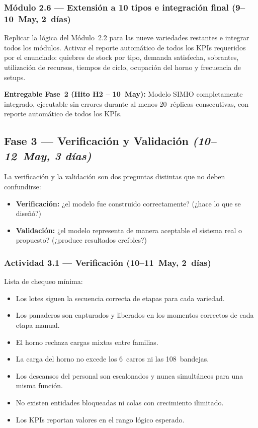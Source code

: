 \documentclass[12pt]{article}
\begin{document}
\subsubsection{Módulo 2.6 --- Extensión a 10 tipos e integración final \quad(9--10~May, 2~días)}

Replicar la lógica del Módulo~2.2 para las nueve variedades restantes e integrar todos los módulos. Activar el reporte automático de todos los KPIs requeridos por el enunciado: quiebres de stock por tipo, demanda satisfecha, sobrantes, utilización de recursos, tiempos de ciclo, ocupación del horno y frecuencia de setups.

\medskip
\noindent\colorbox{grisclaro}{\parbox{\dimexpr\linewidth-2\fboxsep\relax}{\vspace{2pt}\textbf{Entregable Fase~2 (Hito H2 -- 10~May):} Modelo SIMIO completamente integrado, ejecutable sin errores durante al menos 20~réplicas consecutivas, con reporte automático de todos los KPIs.\vspace{2pt}}}

\subsection{Fase 3 --- Verificación y Validación \quad\textit{(10--12~May, 3 días)}}

La verificación y la validación son dos preguntas distintas que no deben confundirse:
\begin{itemize}
  \item \textbf{Verificación:} ¿el modelo fue construido correctamente? (¿hace lo que se diseñó?)
  \item \textbf{Validación:} ¿el modelo representa de manera aceptable el sistema real o propuesto? (¿produce resultados creíbles?)
\end{itemize}

\subsubsection{Actividad 3.1 --- Verificación \quad(10--11~May, 2~días)}

Lista de chequeo mínima:
\begin{itemize}
  \item Los lotes siguen la secuencia correcta de etapas para cada variedad.
  \item Los panaderos son capturados y liberados en los momentos correctos de cada etapa manual.
  \item El horno rechaza cargas mixtas entre familias.
  \item La carga del horno no excede los 6~carros ni las 108~bandejas.
  \item Los descansos del personal son escalonados y nunca simultáneos para una misma función.
  \item No existen entidades bloqueadas ni colas con crecimiento ilimitado.
  \item Los KPIs reportan valores en el rango lógico esperado.
\end{itemize}
\end{document}
